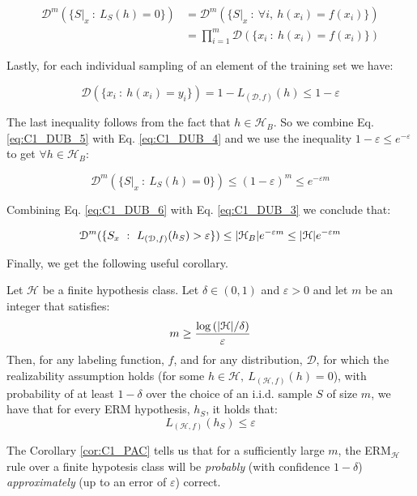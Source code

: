 \documentclass[../../main/main.tex]{subfiles}
\begin{document}
\begin{align}
    \mathcal{D}^m (\{ S|_x \ : \ L_S(h) = 0 \})
    &=
    \mathcal{D}^m (\{ S|_x \ : \ \forall i, \ h(x_i) = f(x_i) \})   \\
    &=
    \prod_{i=1}^{m} \mathcal{D}(\{ x_i \ : \ h(x_i) = f(x_i) \})
    \label{eq:C1_DUB_4}
\end{align}

Lastly, for each individual sampling of an element of the training set we have:

\begin{equation}
    \mathcal{D}(\{ x_i \ : \ h(x_i) = y_i \})
    =
    1 - L_{(\mathcal{D},f)} (h)
    \le
    1 - \varepsilon
    \label{eq:C1_DUB_5}
\end{equation}

The last inequality follows from the fact that \( h \in \mathcal{H}_B \). So we combine Eq. \ref{eq:C1_DUB_5} with Eq. \ref{eq:C1_DUB_4} and we use the inequality \( 1 - \varepsilon \le e^{-\varepsilon} \) to get \( \forall h \in \mathcal{H}_B \):

\begin{equation}
    \mathcal{D}^m (\{ S|_x \ : \ L_S(h) = 0 \})
    \le
    (1 - \varepsilon)^m
    \le
    e^{-\varepsilon m}
    \label{eq:C1_DUB_6}
\end{equation}

Combining Eq. \ref{eq:C1_DUB_6} with Eq. \ref{eq:C1_DUB_3} we conclude that:

\begin{equation}
    \mathcal{D}^m (\{ S_x \ : \ L_{(\mathcal{D},f)}(h_S) > \varepsilon \})
    \le
    \abs{\mathcal{H}_B} e^{- \varepsilon m}
    \le
    \abs{\mathcal{H}} e^{- \varepsilon m}
    \label{eq:C1_DUB_7}
\end{equation}

Finally, we get the following useful corollary.

\begin{corollary}[]
    \label{cor:C1_PAC}
    Let \( \mathcal{H} \) be a finite hypothesis class. Let \( \delta \in (0,1) \) and \( \varepsilon > 0 \) and let \( m \) be an integer that satisfies:
    \[
        m \ge \frac{\log{(\abs{\mathcal{H}} / \delta)}}{\varepsilon}
    \]
    Then, for any labeling function, \( f \), and for any distribution, \( \mathcal{D} \), for which the realizability assumption holds (for some \( h \in \mathcal{H}, \ L_{(\mathcal{H},f)}(h) = 0 \)), with probability of at least \( 1 - \delta \) over the choice of an i.i.d. sample \( S \) of size \( m \), we have that for every ERM hypothesis, \( h_S \), it holds that:
    \[
        L_{(\mathcal{H},f)}(h_S) \le \varepsilon
    \]
\end{corollary}

The Corollary \ref{cor:C1_PAC} tells us that for a sufficiently large \( m \), the ERM$_ \mathcal{H}$ rule over a finite hypotesis class will be \emph{probably} (with confidence \( 1 - \delta \)) \emph{approximately} (up to an error of \( \varepsilon \)) correct.
\end{document}

